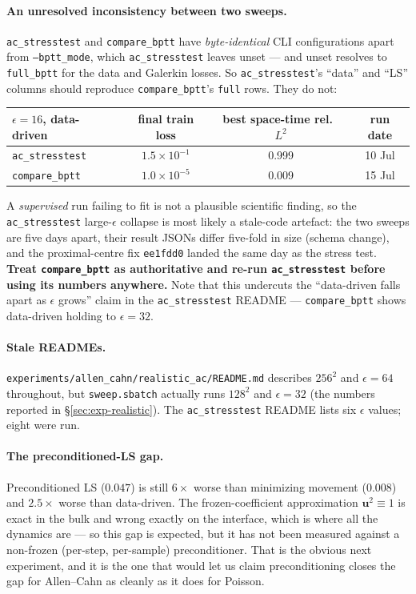 \documentclass[11pt]{article}
\begin{document}
\paragraph{An unresolved inconsistency between two sweeps.}
\label{sec:exp-inconsistency}
\texttt{ac\_stresstest} and \texttt{compare\_bptt} have \emph{byte-identical} CLI configurations
apart from \texttt{--bptt\_mode}, which \texttt{ac\_stresstest} leaves unset --- and unset resolves
to \texttt{full\_bptt} for the data and Galerkin losses. So \texttt{ac\_stresstest}'s ``data'' and
``LS'' columns should reproduce \texttt{compare\_bptt}'s \texttt{full} rows. They do not:
\begin{center}
\begin{tabular}{lccc}
\hline
$\epsilon=16$, data-driven & final train loss & best space-time rel.\ $L^2$ & run date \\
\hline
\texttt{ac\_stresstest}  & $1.5\times10^{-1}$ & 0.999 & 10 Jul \\
\texttt{compare\_bptt}   & $1.0\times10^{-5}$ & 0.009 & 15 Jul \\
\hline
\end{tabular}
\end{center}
A \emph{supervised} run failing to fit is not a plausible scientific finding, so the
\texttt{ac\_stresstest} large-$\epsilon$ collapse is most likely a stale-code artefact: the two
sweeps are five days apart, their result JSONs differ five-fold in size (schema change), and the
proximal-centre fix \texttt{ee1fdd0} landed the same day as the stress test. \textbf{Treat
\texttt{compare\_bptt} as authoritative and re-run \texttt{ac\_stresstest} before using its numbers
anywhere.} Note that this undercuts the ``data-driven falls apart as $\epsilon$ grows'' claim in
the \texttt{ac\_stresstest} README --- \texttt{compare\_bptt} shows data-driven holding to
$\epsilon=32$.

\paragraph{Stale READMEs.} \texttt{experiments/allen\_cahn/realistic\_ac/README.md} describes
$256^2$ and $\epsilon=64$ throughout, but \texttt{sweep.sbatch} actually runs $128^2$ and
$\epsilon=32$ (the numbers reported in \S\ref{sec:exp-realistic}). The
\texttt{ac\_stresstest} README lists six $\epsilon$ values; eight were run.

\paragraph{The preconditioned-LS gap.} Preconditioned LS ($0.047$) is still $6\times$ worse than
minimizing movement ($0.008$) and $2.5\times$ worse than data-driven. The frozen-coefficient
approximation $\mathbf u^2\equiv1$ is exact in the bulk and wrong exactly on the interface, which
is where all the dynamics are --- so this gap is expected, but it has not been measured against a
non-frozen (per-step, per-sample) preconditioner. That is the obvious next experiment, and it is
the one that would let us claim preconditioning closes the gap for Allen--Cahn as cleanly as it
does for Poisson.
\end{document}
